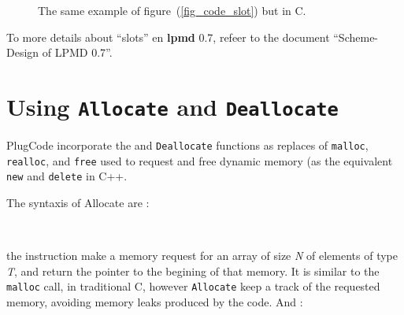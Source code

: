 \documentclass[a4paper,12pt]{article}
\begin{document}
\begin{figure}[ht]\centering{}
\caption{The same example of figure~(\ref{fig_code_slot}) but in C.}
\label{}
\end{figure}

To more details about ``slots'' en \textbf{lpmd} 0.7, refeer to the document
``Scheme-Design of LPMD 0.7''.

\section{Using \texttt{Allocate} and \texttt{Deallocate}}

PlugCode incorporate the  and \texttt{Deallocate}
functions as replaces of \texttt{malloc}, \texttt{realloc}, and \texttt{free}
used to request and free dynamic memory (as the equivalent \texttt{new} and
\texttt{delete} in C++.


The syntaxis of Allocate are :

\vspace{15pt}
 \\
\vspace{15pt}

\noindent
the instruction make a memory request for an array of size \emph{N} of
elements of type \emph{T}, and return the pointer to the begining of that
memory. It is similar to the \texttt{malloc} call, in traditional C, however
\texttt{Allocate} keep a track of the requested memory, avoiding memory leaks
produced by the code. And :

\vspace{15pt}
 \\
\vspace{15pt}
\end{document}
